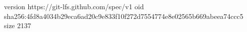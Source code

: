 version https://git-lfs.github.com/spec/v1
oid sha256:4fd8a4034b29eca6ad20c9e833f10f272d7554774e8e02565b669abeea74ccc5
size 2137

